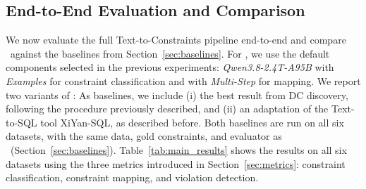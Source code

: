 \subsection{End-to-End Evaluation and Comparison}
\label{sec:endtoend}

We now evaluate the full Text-to-Constraints pipeline end-to-end and compare \system\ against the baselines from Section~\ref{sec:baselines}. For \system, we use the default components selected in the previous experiments: \emph{Qwen3.8-2.4T-A95B} with \emph{Examples} for constraint classification and  with \emph{Multi-Step} for mapping.
We report two variants of \system: 
As baselines, we include (i) the best result from DC discovery, following the procedure previously described, and (ii) an adaptation of the Text-to-SQL tool XiYan-SQL, as described before. Both baselines are run on all six datasets, with the same data, gold constraints, and evaluator as \system\ (Section~\ref{sec:baselines}).
Table~\ref{tab:main_results} shows the results on all six datasets using the three metrics introduced in Section~\ref{sec:metrics}: constraint classification, constraint mapping, and violation detection.

\begin{table}[!ht]
  \centering
  \small
  \setlength{\tabcolsep}{4pt}
  \resizebox{\columnwidth}{!}{%
  
  }%
\caption{End-to-end comparison of \system\ modes, Classifier+Multi-Step (C+MS) and Multi-Step, and the baselines across six
datasets. \textbf{Profiling} denotes DC discovery from data alone, and
\textbf{Text2SQL} denotes XiYan-SQL adapted to generate violation queries from
regulatory sentences; DNF marks configurations that did not finish within the time and memory limits. n/a indicates that the metric is not applicable; bold
marks the best F$_1$ for each metric and dataset.}
  \label{tab:main_results}
\end{table}

